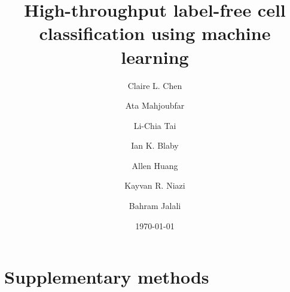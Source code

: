 \documentclass[aps,pra,reprint,groupedaddress]{revtex4-1}
\begin{document}

\title{High-throughput label-free cell classification using machine learning}


\author{Claire L. Chen}
\author{Ata Mahjoubfar}
\author{Li-Chia Tai}
\author{Ian K. Blaby}
\author{Allen Huang}
\author{Kayvan R. Niazi}
\author{Bahram Jalali}


\date{\today}



\maketitle

\section*{Supplementary methods}
\end{document}
